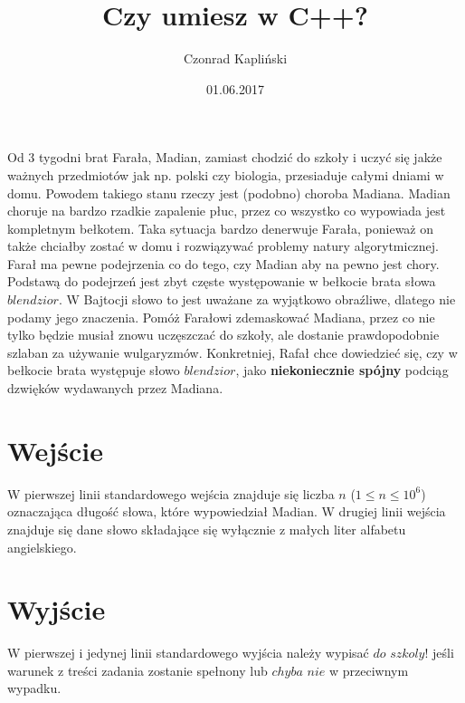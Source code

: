 \documentclass[zad,zawodnik,utf8]{sinol}
\title{Czy umiesz w C++?}
\author{Czonrad Kapliński} %
\date{01.06.2017}
\begin{document}
\begin{tasktext}

Od 3 tygodni brat Farała, Madian, zamiast chodzić do szkoły i uczyć się jakże ważnych przedmiotów jak np. polski czy biologia, przesiaduje całymi dniami w domu.
Powodem takiego stanu rzeczy jest (podobno) choroba Madiana. Madian choruje na bardzo rzadkie zapalenie płuc, przez co wszystko co wypowiada jest kompletnym bełkotem. Taka sytuacja bardzo denerwuje Farała, ponieważ on także chciałby zostać w domu i rozwiązywać problemy natury algorytmicznej. Farał ma pewne podejrzenia co do tego, czy Madian aby na pewno jest chory. Podstawą do podejrzeń jest zbyt częste występowanie w bełkocie brata słowa $blendzior$. W Bajtocji słowo to jest uważane za wyjątkowo obraźliwe, dlatego nie podamy jego znaczenia. Pomóż Farałowi zdemaskować Madiana, przez co nie tylko będzie musiał znowu uczęszczać do szkoły,
ale dostanie prawdopodobnie szlaban za używanie wulgaryzmów. Konkretniej, Rafał chce dowiedzieć się, czy w bełkocie brata występuje słowo $blendzior$, jako \textbf{niekoniecznie spójny} podciąg dzwięków wydawanych przez Madiana.

\section{Wejście}

W pierwszej linii standardowego wejścia znajduje się liczba $n$ ($1 \leq n \leq 10^{6}$) oznaczająca długość słowa, które wypowiedział Madian. W drugiej linii wejścia znajduje się dane słowo składające się wyłącznie z małych liter alfabetu angielskiego.

\section{Wyjście}
W pierwszej i jedynej linii standardowego wyjścia należy wypisać $do$ $szkoly!$ jeśli warunek z treści zadania zostanie spełnony lub $chyba$ $nie$ w przeciwnym wypadku.	
\makecompactexample

\end{tasktext}
\end{document}
